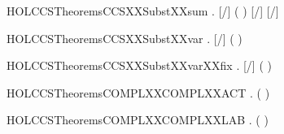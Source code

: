 \newcommand{\HOLCCSTheoremsCCSXXSubstXXself}{\UseVerbatim{HOLCCSTheoremsCCSXXSubstXXself}}
\begin{SaveVerbatim}{HOLCCSTheoremsCCSXXSubstXXsum}
\HOLTokenTurnstile{} \HOLSymConst{\HOLTokenForall{}}   . [/] ( \HOLSymConst{\ensuremath{+}} ) \HOLSymConst{=} [/]  \HOLSymConst{\ensuremath{+}} [/] 
\end{SaveVerbatim}
\newcommand{\HOLCCSTheoremsCCSXXSubstXXsum}{\UseVerbatim{HOLCCSTheoremsCCSXXSubstXXsum}}
\begin{SaveVerbatim}{HOLCCSTheoremsCCSXXSubstXXvar}
\HOLTokenTurnstile{} \HOLSymConst{\HOLTokenForall{}}  . [/] ( ) \HOLSymConst{=}   \HOLSymConst{=}      
\end{SaveVerbatim}
\newcommand{\HOLCCSTheoremsCCSXXSubstXXvar}{\UseVerbatim{HOLCCSTheoremsCCSXXSubstXXvar}}
\begin{SaveVerbatim}{HOLCCSTheoremsCCSXXSubstXXvarXXfix}
\HOLTokenTurnstile{} \HOLSymConst{\HOLTokenForall{}} . [/] ( ) \HOLSymConst{=} 
\end{SaveVerbatim}
\newcommand{\HOLCCSTheoremsCCSXXSubstXXvarXXfix}{\UseVerbatim{HOLCCSTheoremsCCSXXSubstXXvarXXfix}}
\begin{SaveVerbatim}{HOLCCSTheoremsCOMPLXXCOMPLXXACT}
\HOLTokenTurnstile{} \HOLSymConst{\HOLTokenForall{}}.  ( ) \HOLSymConst{=} 
\end{SaveVerbatim}
\newcommand{\HOLCCSTheoremsCOMPLXXCOMPLXXACT}{\UseVerbatim{HOLCCSTheoremsCOMPLXXCOMPLXXACT}}
\begin{SaveVerbatim}{HOLCCSTheoremsCOMPLXXCOMPLXXLAB}
\HOLTokenTurnstile{} \HOLSymConst{\HOLTokenForall{}}.  ( ) \HOLSymConst{=} 
\end{SaveVerbatim}
\newcommand{\HOLCCSTheoremsCOMPLXXCOMPLXXLAB}{\UseVerbatim{HOLCCSTheoremsCOMPLXXCOMPLXXLAB}}
